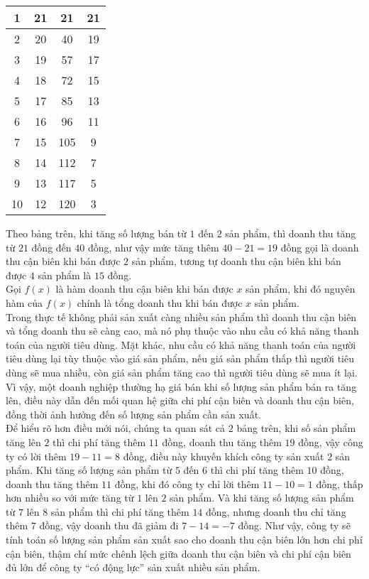 \begin{vd}
{\begin{longtable}{|c|c|c|c|}
			1&21&21&21\\ \hline
			2&20&40&19\\ \hline
			3&19&57&17\\ \hline
			4&18&72&15\\ \hline
			5&17&85&13\\ \hline
			6&16&96&11\\ \hline
			7&15&105&9\\ \hline
			8&14&112&7\\ \hline
			9&13&117&5\\ \hline
			10&12&120&3\\ \hline
		\end{longtable} 
		\noindent Theo bảng trên, khi tăng số lượng bán từ $1$ đến $2$ sản phẩm, thì doanh thu tăng từ $21$ đồng đến $40$ đồng, như vậy mức tăng thêm $40 - 21 = 19$ đồng gọi là doanh thu cận biên khi bán được $2$ sản phẩm, tương tự doanh thu cận biên khi bán được $4$ sản phẩm là $15$ đồng.\\
		Gọi $ f(x) $ là hàm doanh thu cận biên khi bán được $x$ sản phẩm, khi đó nguyên hàm của $ f(x)$ chính là tổng doanh thu khi bán được $x$ sản phẩm.\\
		Trong thực tế không phải sản xuất càng nhiều sản phẩm thì doanh thu cận biên và tổng doanh thu sẽ càng cao, mà nó phụ thuộc vào nhu cầu có khả năng thanh toán của người tiêu dùng. Mặt khác, nhu cầu có khả năng thanh toán của người tiêu dùng lại tùy thuộc vào giá sản phẩm, nếu giá sản phẩm thấp thì người tiêu dùng sẽ mua nhiều, còn giá sản phẩm tăng cao thì người tiêu dùng sẽ mua ít lại. Vì vậy, một doanh nghiệp thường hạ giá bán khi số lượng sản phẩm bán ra tăng lên, điều này dẫn đến mối quan hệ giữa chi phí cận biên và doanh thu cận biên, đồng thời ảnh hưởng đến số lượng sản phẩm cần sản xuất.\\
		Để hiểu rõ hơn điều mới nói, chúng ta quan sát cả $2$ bảng trên, khi số sản phẩm tăng lên $2$ thì chi phí tăng thêm $11$ đồng, doanh thu tăng thêm $19$ đồng, vậy công ty có lời thêm $19 - 11 = 8$ đồng, điều này khuyến khích công ty sản xuất $2$ sản phẩm. Khi tăng số lượng sản phẩm từ $5$ đến $6$ thì chi phí tăng thêm $10$ đồng, doanh thu tăng thêm $11$ đồng, khi đó công ty chỉ lời thêm $11 - 10 = 1$ đồng, thấp hơn nhiều so với mức tăng từ $1$ lên $2$ sản phẩm. Và khi tăng số lượng sản phẩm từ $7$ lên $8$ sản phẩm thì chi phí tăng thêm $14$ đồng, nhưng doanh thu chỉ tăng thêm $7$ đồng, vậy doanh thu đã giảm đi $7 - 14 = -7$ đồng. Như vậy, công ty sẽ tính toán số lượng sản phẩm sản xuất sao cho doanh thu cận biên lớn hơn chi phí cận biên, thậm chí mức chênh lệch giữa doanh thu cận biên và chi phí cận biên đủ lớn để công ty “có động lực” sản xuất nhiều sản phẩm.}
\end{vd}
